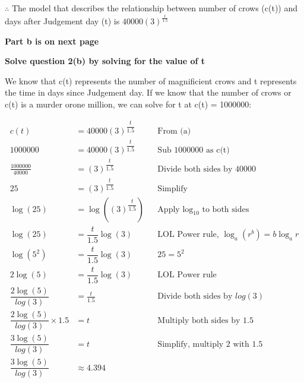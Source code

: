 \documentclass[12pt]{book}
\begin{document}
\begin{enumerate}
\begin{center}
    $\therefore$ The model that describes the relationship between number of crows (c(t)) and days after Judgement day (t) is $\boxed{40000(3)^{\frac{t}{1.5}}}$
\end{center}

\vspace{1cm}

\begin{center}
    \textbf{Part b is on next page}
\end{center}

\newpage

\vspace{0.5cm}
\textbf{Solve question 2(b) by solving for the value of t}

\vspace{0.2cm}
We know that c(t) represents the number of magnificient crows and t represents the 
time in days since Judgement day. If we know that the number of crows or c(t) is a murder 
orone million, we can solve for t at c(t) = 1000000:

\begin{align*}
    c(t) &= 40000(3)^{\dfrac{t}{1.5}} && \text{From (a)} \\
    1000000 &= 40000(3)^{\dfrac{t}{1.5}} && \text{Sub 1000000 as c(t)} \\
    \frac{1000000}{40000} &= (3)^{\dfrac{t}{1.5}} && \text{Divide both sides by 40000} \\
    25 &= (3)^{\dfrac{t}{1.5}} && \text{Simplify} \\
    \log(25) &= \log((3)^{\dfrac{t}{1.5}}) && \text{Apply }\log_{10} \text{ to both sides} \\
    \log(25) &= \dfrac{t}{1.5}\log(3) && \text{LOL Power rule, } \log_a(r^b) = b\log_ar \\
    \log(5^2) &= \dfrac{t}{1.5}\log(3) && 25 = 5^2 \\
    2\log(5) &= \dfrac{t}{1.5}\log(3) && \text{LOL Power rule} \\
    \dfrac{2\log(5)}{log(3)} &= \frac{t}{1.5} && \text{Divide both sides by } log(3) \\
    \dfrac{2\log(5)}{log(3)} \times 1.5 &= t && \text{Multiply both sides by 1.5} \\
    \dfrac{3\log(5)}{log(3)} &= t && \text{Simplify, multiply 2 with 1.5} \\
    \dfrac{3\log(5)}{log(3)} &\approx 4.394  \\
\end{align*}


\end{enumerate}
\end{document}
